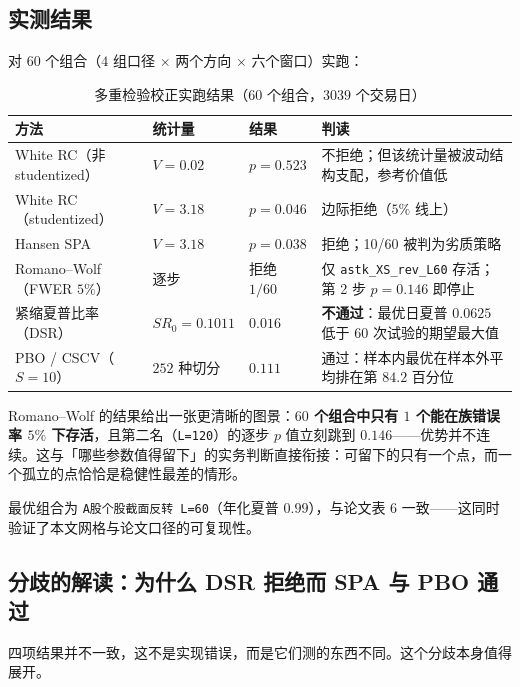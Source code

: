 \subsection{实测结果}

对 $60$ 个组合（$4$ 组口径 $\times$ 两个方向 $\times$ 六个窗口）实跑：

\begin{table}[htbp]
\centering\footnotesize
\caption{多重检验校正实跑结果（$60$ 个组合，$3039$ 个交易日）}\label{tab:mtres}
\begin{tabular}{@{}>{\raggedright\arraybackslash}p{4.1cm}>{\raggedright\arraybackslash}p{3.2cm}>{\raggedright\arraybackslash}p{1.9cm}>{\raggedright\arraybackslash}p{5.0cm}@{}}
\toprule
\textbf{方法} & \textbf{统计量} & \textbf{结果} & \textbf{判读} \\
\midrule
White RC（非 studentized） & $V=0.02$ & $p=0.523$ & 不拒绝；但该统计量被波动结构支配，参考价值低 \\
White RC（studentized） & $V=3.18$ & $p=0.046$ & 边际拒绝（$5\%$ 线上） \\
Hansen SPA & $V=3.18$ & $p=0.038$ & 拒绝；10/60 被判为劣质策略 \\
Romano--Wolf（FWER $5\%$） & 逐步 & 拒绝 $1/60$ & 仅 \texttt{astk\_XS\_rev\_L60} 存活；第 2 步 $p=0.146$ 即停止 \\
紧缩夏普比率（DSR） & $SR_0=0.1011$ & $0.016$ & \textbf{不通过}：最优日夏普 $0.0625$ 低于 $60$ 次试验的期望最大值 \\
PBO / CSCV（$S=10$） & $252$ 种切分 & $0.111$ & 通过：样本内最优在样本外平均排在第 $84.2$ 百分位 \\
\bottomrule
\end{tabular}
\end{table}

Romano--Wolf 的结果给出一张更清晰的图景：\textbf{$60$ 个组合中只有 $1$ 个能在族错误率 $5\%$ 下存活}，且第二名（\texttt{L=120}）的逐步 $p$ 值立刻跳到 $0.146$——优势并不连续。这与「哪些参数值得留下」的实务判断直接衔接：可留下的只有一个点，而一个孤立的点恰恰是稳健性最差的情形。

最优组合为 \texttt{A股个股截面反转 L=60}（年化夏普 $0.99$），与论文表 $6$ 一致——这同时验证了本文网格与论文口径的可复现性。

\subsection{分歧的解读：为什么 DSR 拒绝而 SPA 与 PBO 通过}

四项结果并不一致，这不是实现错误，而是它们测的东西不同。这个分歧本身值得展开。

